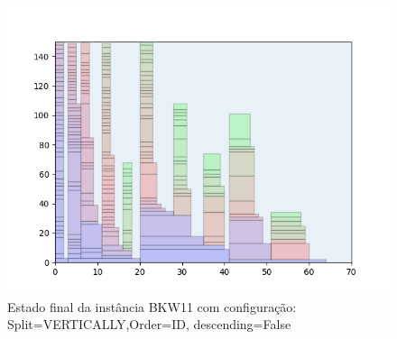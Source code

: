\begin{figure}[H]
    \centering
    \caption[]{Estado final da instância BKW11 com configuração: Split=VERTICALLY,Order=ID, descending=False}
    \label{fig:bkw11-vertically-id-false}
    \includegraphics[scale=0.5]{output/figures/bkw/bkw11/vertically/id/false/000}
\end{figure}